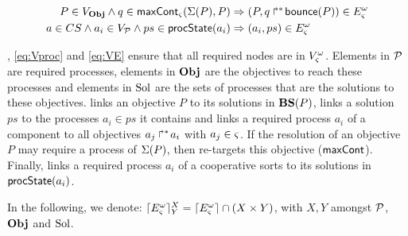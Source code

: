 \begin{definition}
\begin{align}
    P \in V_{\mathbf{Obj}} \wedge q \in \mathsf{maxCont}_\varsigma(\Sigma(P), P) &\Rightarrow (P, \mbox{$q\Rsh^*\!\mathsf{bounce}(P)$}) \in E_\varsigma^\omega \label{eq:ECont} \\
    a \in CS \wedge a_i \in V_{\mathcal{P}} \wedge ps \in \mathsf{procState}(a_i) &\Rightarrow (a_i, ps) \in E_\varsigma^\omega \label{eq:EPrio}
  \end{align}
\end{definition}

, \eqref{eq:Vproc} and \eqref{eq:VE} ensure that all required nodes are in $V_\varsigma^\omega$.
Elements in $\mathcal{P}$ are required processes,
elements in $\mathbf{Obj}$ are the objectives to reach these processes
and elements in $\mathrm{Sol}$ are the sets of processes that are the solutions to these objectives.
 links an objective $P$ to its solutions in $\mathbf{BS}(P)$,
 links a solution $ps$ to the processes $a_i \in ps$ it contains and
 links a required process $a_i$ of a component to all objectives $\mbox{${a}_{j}\Rsh^*\!{a}_{i}$}$ with $a_j \in \varsigma$.
If the resolution of an objective $P$ may require a process of $\Sigma(P)$, then  re-targets this objective ($\mathsf{maxCont}$).
Finally,  links a required process $a_i$ of a cooperative sorts to its solutions in $\mathsf{procState}(a_i)$.

In the following, we denote:
$\lceil E_\varsigma^\omega\rceil^{X}_{Y} = \lceil E_\varsigma^\omega\rceil \cap (X \times Y)$, with $X, Y$ amongst $\mathcal{P}$, $\mathbf{Obj}$ and $\mathrm{Sol}$.

